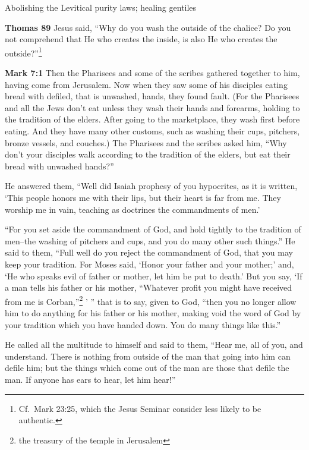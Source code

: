\documentclass[10pt,twoside]{article} %
\newcommand{\quotesize}{\normalsize{}}
\newenvironment{quotetext}{\begingroup\quotesize}{\endgroup}
\newcommand{\bible}[2]{\begin{quotetext}\textbf{#1} #2\end{quotetext}}
\newcommand{\gospelmark}[2]{\bible{Mark #1}{#2}}
\newcommand{\thomas}[2]{\bible{Thomas #1}{#2}}
\begin{document}
\begin{section}{Abolishing the Levitical purity laws; healing gentiles}

\thomas{89}{
Jesus said, ``Why do you wash the outside of the chalice? Do you not comprehend that He who creates the inside, is also He who creates 
the outside?''\footnote{Cf.~Mark
23:25, which the Jesus Seminar consider less likely to be authentic.}
}

\gospelmark{7:1}{
 Then the Pharisees and some of the scribes gathered together to him, having come from Jerusalem.   Now when they saw some of his disciples eating bread with defiled, that is unwashed, hands, they found fault.   (For the Pharisees and all the Jews don't eat unless they wash their hands and forearms, holding to the tradition of the elders.
After going to the marketplace, they wash first before eating. And they have many other customs, such as washing
their cups, pitchers, bronze vessels, and couches.)   The Pharisees and the scribes asked him, ``Why don't your disciples walk according to the tradition of the elders, but eat their bread with unwashed hands?''


  He answered them, ``Well did Isaiah prophesy of you hypocrites, as it is written,
`This people honors me with their lips,
but their heart is far from me.
   They worship me in vain,
teaching as doctrines the commandments of men.'

   ``For you set aside the commandment of God, and hold tightly to the tradition of men--the washing of pitchers and cups, and you do many other such things.''   He said to them, ``Full well do you reject the commandment of God, that you may keep your tradition.    For Moses said, `Honor your father and your mother;' and, `He who speaks evil of father or mother, let him be put to death.'    But you say, `If a man tells his father or his mother, ``Whatever profit you might have received from me is Corban,''\footnote{the treasury of the temple in Jerusalem} ' '' that is to say, given to God,    ``then you no longer allow him to do anything for his father or his mother,    making void the word of God by your tradition which you have handed down. You do many things like this.''

  He called all the multitude to himself and said to them, ``Hear me, all of you, and understand.    There is nothing from outside of the man that going into him can defile him; but the things which come out of the man are those that defile the man.    If anyone has ears to hear, let him hear!''

}
\end{section}
\end{document}
